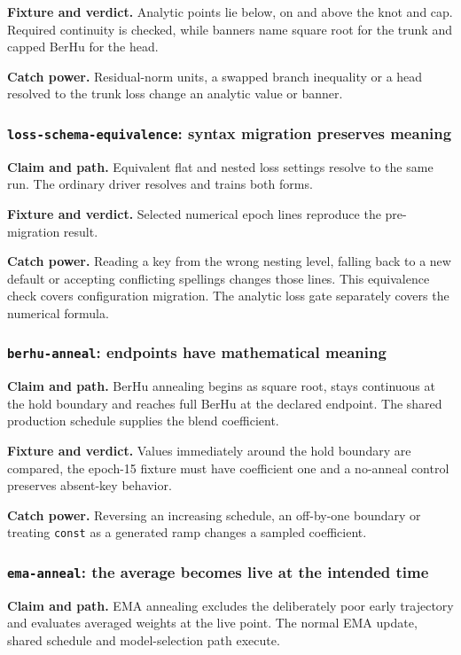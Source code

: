 \documentclass[10pt,aps,prd,twocolumn,nofootinbib]{revtex4-2}
\newcommand{\code}[1]{\texttt{#1}}
\begin{document}
\textbf{Fixture and verdict.}  Analytic points lie below, on and above the
knot and cap.  Required continuity is checked, while banners name square root
for the trunk and capped BerHu for the head.

\textbf{Catch power.}  Residual-norm units, a swapped branch inequality or a
head resolved to the trunk loss change an analytic value or banner.

\subsubsection{\code{loss-schema-equivalence}: syntax migration preserves meaning}

\textbf{Claim and path.}  Equivalent flat and nested loss settings resolve to
the same run.  The ordinary driver resolves and trains both forms.

\textbf{Fixture and verdict.}  Selected numerical epoch lines reproduce the
pre-migration result.

\textbf{Catch power.}  Reading a key from the wrong nesting level, falling
back to a new default or accepting conflicting spellings changes those
lines.  This equivalence check covers configuration migration.  The analytic
loss gate separately covers the numerical formula.

\subsubsection{\code{berhu-anneal}: endpoints have mathematical meaning}

\textbf{Claim and path.}  BerHu annealing begins as square root, stays
continuous at the hold boundary and reaches full BerHu at the declared
endpoint.  The shared production schedule supplies the blend coefficient.

\textbf{Fixture and verdict.}  Values immediately around the hold boundary
are compared, the epoch-15 fixture must have coefficient one and a no-anneal
control preserves absent-key behavior.

\textbf{Catch power.}  Reversing an increasing schedule, an off-by-one
boundary or treating \code{const} as a generated ramp changes a sampled
coefficient.

\subsubsection{\code{ema-anneal}: the average becomes live at the intended time}

\textbf{Claim and path.}  EMA annealing excludes the deliberately poor early
trajectory and evaluates averaged weights at the live point.  The normal EMA
update, shared schedule and model-selection path execute.
\end{document}
